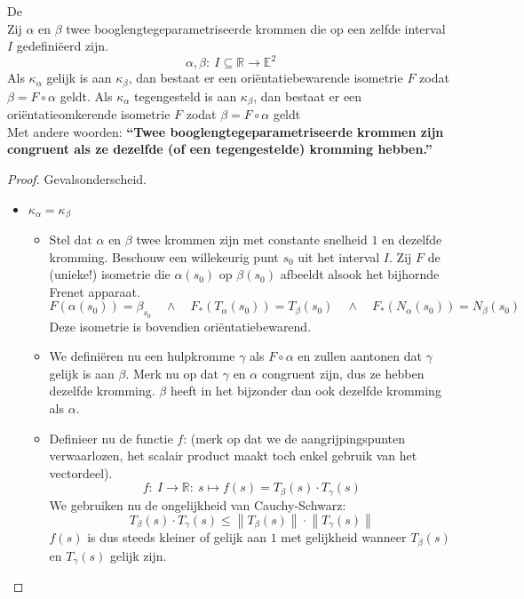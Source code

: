 \documentclass[main.tex]{subfiles}
\begin{document}
\begin{st}
  \examen
  De \\
  Zij $\alpha$ en $\beta$ twee booglengtegeparametriseerde krommen die op een zelfde interval $I$ gedefini\"eerd zijn.
  \[ \alpha,\beta:\ I \subseteq \mathbb{R} \rightarrow \mathbb{E}^{2} \]
  Als $\kappa_{\alpha}$ gelijk is aan $\kappa_{\beta}$, dan bestaat er een ori\"entatiebewarende isometrie $F$ zodat $\beta = F \circ \alpha$ geldt.
  Als $\kappa_{\alpha}$ tegengesteld is aan $\kappa_{\beta}$, dan bestaat er een ori\"entatieomkerende isometrie $F$ zodat $\beta = F \circ \alpha$ geldt\\
  Met andere woorden:
  \textbf{``Twee booglengtegeparametriseerde krommen zijn congruent als ze dezelfde (of een tegengestelde) kromming hebben.''}

  \begin{proof}
    Gevalsonderscheid.
    \begin{itemize}
    \item $\kappa_{\alpha} = \kappa_{\beta}$\\
      \begin{itemize}
      \item 
      Stel dat $\alpha$ en $\beta$ twee krommen zijn met constante snelheid $1$ en dezelfde kromming.
      Beschouw een willekeurig punt $s_{0}$ uit het interval $I$.
      Zij $F$ de (unieke!) isometrie die $\alpha(s_{0})$ op $\beta(s_{0})$ afbeeldt alsook het bijhornde Frenet apparaat.
      \[ F(\alpha(s_{0})) = \beta_{s_{0}} \quad\wedge\quad
      F_{*}(T_{\alpha}(s_{0})) = T_{\beta}(s_{0}) \quad\wedge\quad
      F_{*}(N_{\alpha}(s_{0})) = N_{\beta}(s_{0}) \] Deze isometrie is
      bovendien ori\"entatiebewarend.
    \item We defini\"eren nu een hulpkromme $\gamma$ als $F \circ \alpha$ en zullen aantonen dat $\gamma$ gelijk is aan $\beta$.
      Merk nu op dat $\gamma$ en $\alpha$ congruent zijn, dus ze hebben dezelfde kromming.
      $\beta$ heeft in het bijzonder dan ook dezelfde kromming als $\alpha$.
    \item Definieer nu de functie $f$: (merk op dat we de aangrijpingspunten verwaarlozen, het scalair product maakt toch enkel gebruik van het vectordeel).
      \[ f:\ I \rightarrow \mathbb{R}:\ s \mapsto f(s) = T_{\beta}(s) \cdot T_{\gamma}(s) \]
      We gebruiken nu de ongelijkheid van Cauchy-Schwarz:
      \[ T_{\beta}(s) \cdot T_{\gamma}(s) \le \left\| T_{\beta}(s) \right\| \cdot \left\| T_{\gamma}(s) \right\|  \]
      $f(s)$ is dus steeds kleiner of gelijk aan $1$ met gelijkheid wanneer $T_{\beta}(s)$ en $T_{\gamma}(s)$ gelijk zijn.


\end{itemize}
\end{itemize}
\end{proof}
\end{st}
\end{document}
